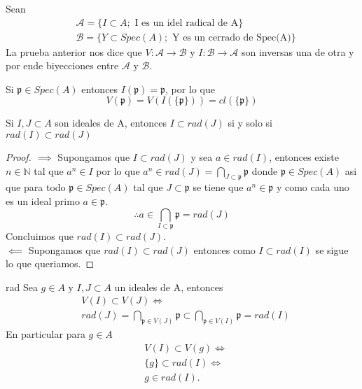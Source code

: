 \documentclass{article}
\begin{document}
\begin{observacion}{}{}
    Sean 
    \begin{align*}
        &\mathcal{A} = \{I \subset A; \mbox{ I es un idel radical de A}\}\\
        &\mathcal{B} = \{Y \subset Spec(A); \mbox{ Y es un cerrado de Spec(A)}\}
    \end{align*}
    La prueba anterior nos dice que $V:\mathcal{A} \rightarrow \mathcal{B}$ y 
    $I: \mathcal{B} \rightarrow \mathcal{A}$ son inversas una de otra y por ende
    biyecciones entre $\mathcal{A}$ y $\mathcal{B}$.
\end{observacion}

\begin{observacion}{}{}
    Si $\mathfrak{p}\in Spec(A)$ entonces
    $I({\mathfrak{p}})=\mathfrak{p}$, 
    por lo que
    $$V(\mathfrak{p})
    =V(I(\{\mathfrak{p}\}))
    =cl(\{\mathfrak{p}\})$$
\end{observacion}

\begin{lema}{}{}
    Si $I, J \subset A$ son ideales de A, entonces 
    $I \subset rad(J)$ si y solo si $rad(I)\subset rad(J)$
\end{lema}
\begin{proof}
    $\implies$ Supongamos que $I \subset rad(J)$ y sea $a \in rad(I)$,
    entonces existe $n \in \mathbb{N}$ tal que $a^n \in I$ por lo que 
    $a^n \in rad(J) = \bigcap_{J\subset \mathfrak{p}}\mathfrak{p}$ donde $\mathfrak{p}\in Spec(A)$
    asi que para todo $\mathfrak{p} \in Spec(A)$ tal que $J\subset \mathfrak{p}$
    se tiene que $a^n \in \mathfrak{p}$ y como cada uno es un ideal primo
    $a\in \mathfrak{p}$.
    $$\therefore a \in \bigcap_{I\subset \mathfrak{p}}\mathfrak{p} = rad(J)$$
    Concluimos que $rad(I) \subset rad(J)$.\\
    $\impliedby$ Supongamos que $rad(I)\subset rad(J)$ entonces como 
    $I\subset rad(I)$ se sigue lo que queriamos.
\end{proof}

\begin{corolario}{}{rad}
    Sea $g \in A$ y $I, J \subset A$ un ideales de A,
    entonces 
    \begin{align*}
        &V(I) \subset V(J) \iff \\
        &rad(J)= \bigcap_{\mathfrak{p} \in V(J)} \mathfrak{p}\subset \bigcap_{\mathfrak{p}\in V(I)}\mathfrak{p} =rad(I)
    \end{align*}
    En particular para $g\in A$
    \begin{align*}
        &V(I) \subset V(g) \iff \\ 
        &\{g\} \subset rad(I) \iff \\
        &g \in rad(I).
    \end{align*}
\end{corolario}
\end{document}
